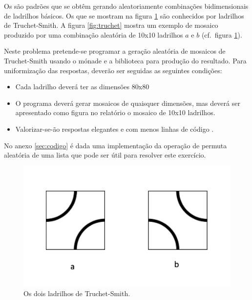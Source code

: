 \documentclass[a4paper]{article}
\newcommand{\Varid}[1]{\mathit{#1}}
\begin{document}
Os  são padrões que se obtêm gerando aleatoriamente
combinações bidimensionais de ladrilhos básicos. Os que se mostram na figura
\ref{fig:tiles} são conhecidos por ladrilhos de Truchet-Smith.
A figura \ref{fig:truchet} mostra um exemplo de mosaico produzido por uma
combinação aleatória de 10x10 ladrilhos \ensuremath{\Varid{a}} e \ensuremath{\Varid{b}} (cf.\ figura
\ref{fig:tiles}).

Neste problema pretende-se programar a geração aleatória de mosaicos de
Truchet-Smith usando o mónade  e a biblioteca 
para produção do resultado. Para uniformização das respostas, deverão ser
seguidas as seguintes condições:
\begin{itemize}
\item   Cada ladrilho deverá ter as dimensões 80x80
\item   O programa deverá gerar mosaicos de quaisquer dimensões, mas deverá ser apresentado como figura no relatório o mosaico de 10x10 ladrilhos.
\item   Valorizar-se-ão respostas elegantes e com menos linhas de código \Haskell.
\end{itemize} 
No anexo \ref{sec:codigo} é dada uma implementação da operação de permuta aleatória de uma lista que pode ser útil para resolver este exercício.

    \begin{figure}\centering
    \includegraphics[scale=0.20]{images/tiles.png}
    \caption{Os dois ladrilhos de Truchet-Smith.}
    \label{fig:tiles}
    \end{figure}
\end{document}
